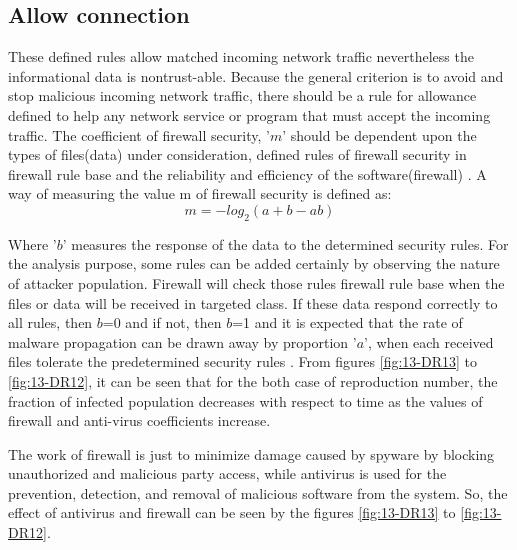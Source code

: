\subsection{Allow connection}
These defined rules allow matched incoming network traffic nevertheless the informational data is nontrust-able.
 Because the general criterion is to avoid and stop malicious incoming network traffic, there should be
 a rule for allowance defined to help any network service or program that must accept the incoming traffic.
The coefficient of firewall security, '$m$' should be dependent upon the types of files(data) under
consideration, defined rules of firewall security in firewall rule base and the reliability
and efficiency of the software(firewall) \cite{edtr15}. A way of measuring the value m of firewall
security is defined as:
\begin{equation} m = - log_2 (a+b-ab) \end{equation}
\par Where '$b$' measures the response of the data to the determined security rules. For the
analysis purpose, some rules can be added certainly by observing the nature of attacker population. Firewall will check those rules
firewall rule base when the files or data will be received in targeted class. If these data respond correctly to all rules, then $b$=0 and if not,
then $b$=1 and it is expected that the rate of malware propagation
can be drawn away by proportion '$a$', when each received files tolerate the predetermined security rules \cite{edtr15}.
\clearpage
From figures \ref{fig:13-DR13} to \ref{fig:13-DR12}, it can be seen that for the both case of reproduction number, the fraction of infected population decreases with respect to time as the values of firewall and anti-virus  coefficients increase.
\par The work of  firewall is just to minimize damage caused by spyware by blocking unauthorized and malicious party access, while antivirus is used for the prevention, detection, and removal of malicious software from the system. So, the effect of antivirus and firewall can be seen by the figures \ref{fig:13-DR13} to \ref{fig:13-DR12}.

